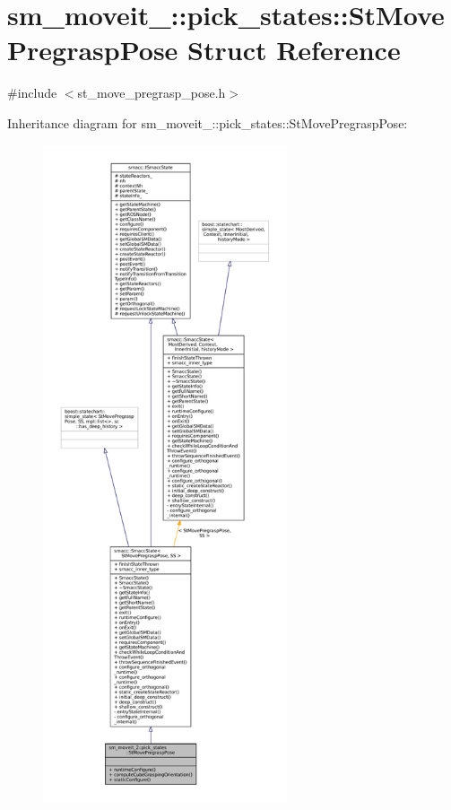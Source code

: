 \hypertarget{structsm__moveit__2_1_1pick__states_1_1StMovePregraspPose}{}\section{sm\+\_\+moveit\+\_\+:\+:pick\+\_\+states\+:\+:St\+Move\+Pregrasp\+Pose Struct Reference}
\label{structsm__moveit__2_1_1pick__states_1_1StMovePregraspPose}


{\ttfamily \#include $<$st\+\_\+move\+\_\+pregrasp\+\_\+pose.\+h$>$}



Inheritance diagram for sm\+\_\+moveit\+\_\+:\+:pick\+\_\+states\+:\+:St\+Move\+Pregrasp\+Pose\+:
\nopagebreak
\begin{figure}[H]
\begin{center}
\leavevmode
\includegraphics[height=550pt]{structsm__moveit__2_1_1pick__states_1_1StMovePregraspPose__inherit__graph}
\end{center}
\end{figure}


